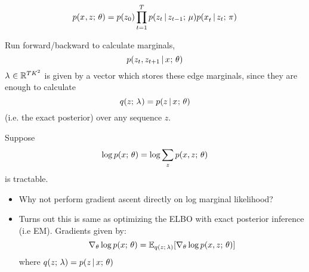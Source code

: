 \begin{frame}
\begin{center}
\end{center} 
\[ p(x^{}, z ; \, \theta) =   p(z_0) \prod_{t=1}^T p(z_t \,|\, z_{t-1} ; \, \mu)p(x_t^{} \,|\, z_t ; \, \pi) \]
\end{frame}

\begin{frame}
Run forward/backward to calculate marginals,
\[ p(z_t, z_{t+1} \,|\, x^{} ; \, \theta) \]
$\lambda^{} \in \mathbb{R}^{TK^2}$ is given by a vector which stores these edge marginals, since they are enough to calculate 
\[  q(z ; \, \lambda^{}) = p(z \,|\, x^{} ; \, \theta) \] 
(i.e. the exact posterior) over any sequence $z$.
\end{frame}

\begin{frame}
Suppose 
\[ \log p( x ; \,\theta) = \log \sum_{z} p (x , z ; \, \theta)\]
is tractable.
\\
\begin{itemize}
    \item Why not perform gradient ascent directly on log marginal likelihood?
    \item Turns out this is same as optimizing the ELBO with exact posterior inference (i.e EM). Gradients given by:
    \[   \nabla_\theta \log p(x ; \, \theta)  = \mathbb{E}_{q(z  ; \, \lambda)} [\nabla_\theta \log p(x, z ; \, \theta)] \] 
    where $q(z ; \, \lambda) = p(z \,|\, x ; \, \theta)$
\end{itemize}
 \end{frame}


